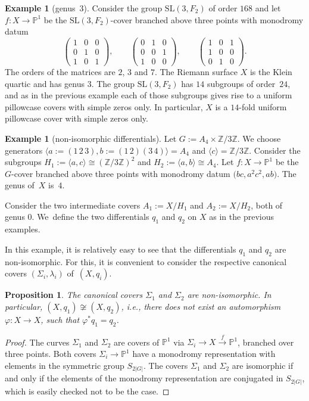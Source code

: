 \documentclass[pdftex]{sigma}
\numberwithin{equation}{section}
\newtheorem{prop}[theo]{Proposition}
\theoremstyle{definition}
\newtheorem{exam}[theo]{Example}
\renewcommand{\to}{\rightarrow}
\newcommand{\ZZ}{\mathbb{Z}}
\newcommand{\PP}{\mathbb{P}}
\newcommand{\SL}{\mathrm{SL}}
\begin{document}
\begin{exam}[genus~3]
Consider the group $\SL(3,F_2)$ of order $168$ and let $f\colon X\to\PP^1$ be the $\SL(3,F_2)$-cover branched above three points with monodromy datum
\[
	\begin{pmatrix}1&0&0\\0&1&0\\1&0&1\end{pmatrix}, \qquad
	\begin{pmatrix}0&1&0\\0&0&1\\1&0&0\end{pmatrix}, \qquad
	\begin{pmatrix}1&0&1\\1&0&0\\0&1&0\end{pmatrix}.
\]
The orders of the matrices are $2$, $3$ and $7$. The Riemann surface $X$ is the Klein quartic and has genus $3$.
The group $\SL(3,F_2)$ has $14$ subgroups of order~$24$, and as in the previous example each of those subgroups gives rise to a uniform pillowcase covers with simple zeros only.
In particular, $X$ is a $14$-fold uniform pillowcase cover with simple zeros only.
\end{exam}

\begin{exam}[non-isomorphic differentials]\label{exam:bifold_nonisom}
Let $G := A_4 \times \ZZ/3\ZZ$.
We choose generators $\langle a:= (1\, 2\, 3), b:=(1\, 2)(3\, 4) \rangle = A_4$ and $\langle c \rangle = \ZZ/3\ZZ$.
Consider the subgroups $H_1 := \langle a, c \rangle \cong (\ZZ/3\ZZ)^2$
and $H_2 := \langle a, b \rangle \cong A_4$.
Let $f\colon X \to \PP^1$ be the $G$-cover branched above three points with monodromy datum $\bigl(bc, a^2c^2, ab\bigr)$.
The genus of~$X$ is~$4$.

Consider the two intermediate covers $A_1 := X/H_1$ and $A_2 := X/H_2$, both of genus $0$.
We~define the two differentials $q_1$ and $q_2$ on $X$ as in the previous examples.

In this example, it is relatively easy to see that the differentials $q_1$ and $q_2$ are non-isomorphic.
For this, it is convenient to consider the respective canonical covers $(\Sigma_i, \lambda_i)$ of~$(X, q_i)$.
\end{exam}
\begin{prop}\label{prop:non-isomorphic_pillow}
	The canonical covers $\Sigma_1$ and $\Sigma_2$ are non-isomorphic.
	In particular, $(X,q_1) \not \cong (X,q_2)$, i.e., there does not exist an automorphism $\varphi\colon X \to X$, such that $\varphi^* q_1 = q_2$.
\end{prop}
\begin{proof}
	The curves $\Sigma_1$ and $\Sigma_2$ are covers of $\PP^1$ via $\Sigma_i \to X \xrightarrow{f} \PP^1$, branched over three points.
	Both covers $\Sigma_i \to \PP^1$ have a monodromy representation with elements in the symmetric group $S_{2|G|}$.
	The covers $\Sigma_1$ and $\Sigma_2$ are isomorphic if and only if the elements of the monodromy representation are conjugated in $S_{2|G|}$, which is easily checked not to be the case.
\end{proof}
\end{document}
